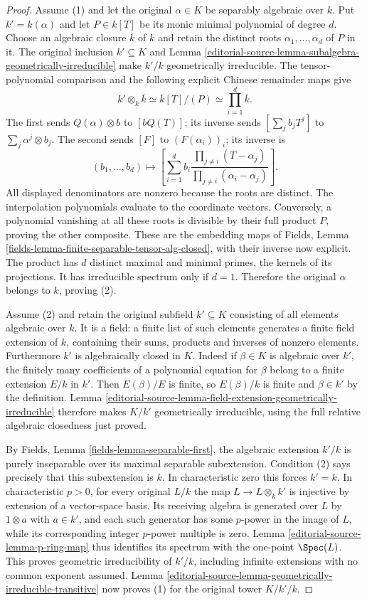 \begin{proof}
Assume (1) and let the original
$\alpha\in K$ be separably algebraic
over $k$. Put $k'=k(\alpha)$ and
let $P\in k[T]$ be its monic
minimal polynomial of degree $d$.
Choose an algebraic closure
$\overline k$ of $k$ and retain
the distinct roots
$\alpha_1,\ldots,\alpha_d$ of $P$
in it. The original inclusion
$k'\subseteq K$ and Lemma
\ref{editorial-source-lemma-subalgebra-geometrically-irreducible}
make $k'/k$ geometrically irreducible.
The tensor-polynomial comparison
and the following explicit Chinese
remainder maps give
$$
k'\otimes_k\overline k\simeq
\overline k[T]/(P)\simeq\prod_{i=1}^d\overline k.
$$
The first sends $Q(\alpha)\otimes b$
to $[bQ(T)]$; its inverse sends
$[\sum_j b_jT^j]$ to
$\sum_j\alpha^j\otimes b_j$.
The second sends $[F]$ to
$(F(\alpha_i))_i$; its inverse is
$$
(b_1,\ldots,b_d)\longmapsto
\left[\sum_{i=1}^d b_i
\frac{\prod_{j\ne i}(T-\alpha_j)}
{\prod_{j\ne i}(\alpha_i-\alpha_j)}\right].
$$
All displayed denominators are
nonzero because the roots are
distinct. The interpolation
polynomials evaluate to the
coordinate vectors. Conversely,
a polynomial vanishing at all
these roots is divisible by
their full product $P$, proving
the other composite. These are
the embedding maps of Fields,
Lemma
\ref{fields-lemma-finite-separable-tensor-alg-closed},
with their inverse now explicit.
The product has $d$ distinct
maximal and minimal primes,
the kernels of its projections.
It has irreducible spectrum
only if $d=1$. Therefore the
original $\alpha$ belongs to $k$,
proving (2).

Assume (2) and retain the original
subfield $k'\subseteq K$ consisting
of all elements algebraic over $k$.
It is a field: a finite list of
such elements generates a finite
field extension of $k$, containing
their sums, products and inverses
of nonzero elements. Furthermore
$k'$ is algebraically closed in
$K$. Indeed if $\beta\in K$ is
algebraic over $k'$, the finitely
many coefficients of a polynomial
equation for $\beta$ belong to a
finite extension $E/k$ in $k'$.
Then $E(\beta)/E$ is finite, so
$E(\beta)/k$ is finite and
$\beta\in k'$ by the definition.
Lemma
\ref{editorial-source-lemma-field-extension-geometrically-irreducible}
therefore makes $K/k'$ geometrically
irreducible, using the full relative
algebraic closedness just proved.

By Fields, Lemma
\ref{fields-lemma-separable-first},
the algebraic extension $k'/k$
is purely inseparable over its
maximal separable subextension.
Condition (2) says precisely
that this subextension is $k$.
In characteristic zero this
forces $k'=k$. In characteristic
$p>0$, for every original $L/k$
the map $L\to L\otimes_k k'$
is injective by extension of
a vector-space basis. Its
receiving algebra is generated
over $L$ by $1\otimes a$ with
$a\in k'$, and each such
generator has some $p$-power
in the image of $L$, while
its corresponding integer
$p$-power multiple is zero.
Lemma \ref{editorial-source-lemma-p-ring-map}
thus identifies its spectrum
with the one-point $\Spec(L)$.
This proves geometric
irreducibility of $k'/k$,
including infinite extensions
with no common exponent assumed.
Lemma
\ref{editorial-source-lemma-geometrically-irreducible-transitive}
now proves (1) for the original
tower $K/k'/k$.


\end{proof}

